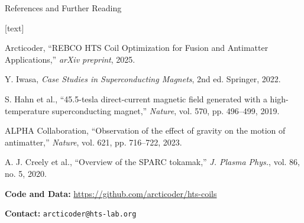 \documentclass[aspectratio=169,xcolor={table,dvipsnames}]{beamer}
\begin{document}
\begin{frame}{References and Further Reading}
    \begin{thebibliography}{10}
        [text]
        
         Arcticoder, ``REBCO HTS Coil Optimization for Fusion and Antimatter Applications,'' \textit{arXiv preprint}, 2025.
        
         Y. Iwasa, \textit{Case Studies in Superconducting Magnets}, 2nd ed. Springer, 2022.
        
         S. Hahn et al., ``45.5-tesla direct-current magnetic field generated with a high-temperature superconducting magnet,'' \textit{Nature}, vol. 570, pp. 496--499, 2019.
        
         ALPHA Collaboration, ``Observation of the effect of gravity on the motion of antimatter,'' \textit{Nature}, vol. 621, pp. 716--722, 2023.
        
         A. J. Creely et al., ``Overview of the SPARC tokamak,'' \textit{J. Plasma Phys.}, vol. 86, no. 5, 2020.
        
    \end{thebibliography}
    
    \vspace{0.5cm}
    \textbf{Code and Data:} \url{https://github.com/arcticoder/hts-coils}
    
    \textbf{Contact:} \texttt{arcticoder@hts-lab.org}
\end{frame}
\end{document}
